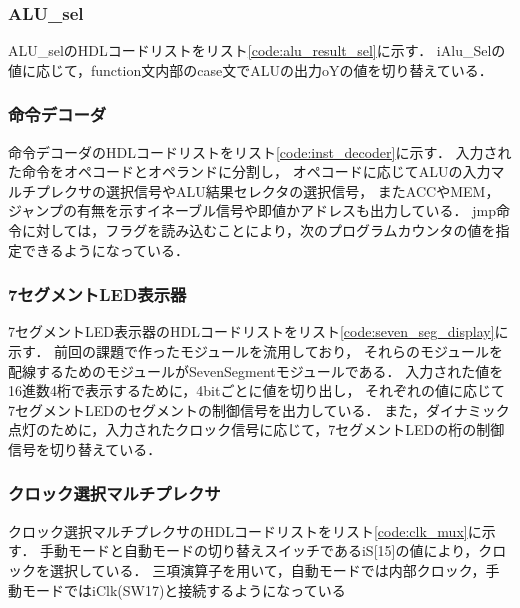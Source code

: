 \documentclass[a4paper,11pt]{ltjsarticle}
\begin{document}
\subsubsection{ALU\_sel}
ALU\_selのHDLコードリストをリスト\ref{code:alu_result_sel}に示す．
iAlu\_Selの値に応じて，function文内部のcase文でALUの出力oYの値を切り替えている．
\subsubsection{命令デコーダ}
命令デコーダのHDLコードリストをリスト\ref{code:inst_decoder}に示す．
入力された命令をオペコードとオペランドに分割し，
オペコードに応じてALUの入力マルチプレクサの選択信号やALU結果セレクタの選択信号，
またACCやMEM，ジャンプの有無を示すイネーブル信号や即値かアドレスも出力している．
jmp命令に対しては，フラグを読み込むことにより，次のプログラムカウンタの値を指定できるようになっている．
\subsubsection{7セグメントLED表示器}
7セグメントLED表示器のHDLコードリストをリスト\ref{code:seven_seg_display}に示す．
前回の課題で作ったモジュールを流用しており，
それらのモジュールを配線するためのモジュールがSevenSegmentモジュールである．
入力された値を16進数4桁で表示するために，4bitごとに値を切り出し，
それぞれの値に応じて7セグメントLEDのセグメントの制御信号を出力している．
また，ダイナミック点灯のために，入力されたクロック信号に応じて，7セグメントLEDの桁の制御信号を切り替えている．
\subsubsection{クロック選択マルチプレクサ}
クロック選択マルチプレクサのHDLコードリストをリスト\ref{code:clk_mux}に示す．
手動モードと自動モードの切り替えスイッチであるiS[15]の値により，クロックを選択している．
三項演算子を用いて，自動モードでは内部クロック，手動モードではiClk(SW17)と接続するようになっている
\end{document}
